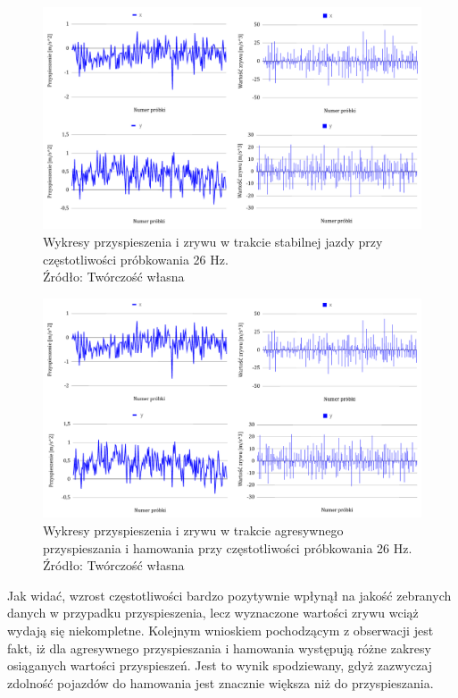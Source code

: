 \begin{figure}[H]
	\centering
	\includegraphics[width=15cm]{img/driving_analysis/stabilna_26.png}
	\caption{Wykresy przyspieszenia i zrywu w trakcie stabilnej jazdy przy częstotliwości próbkowania 26 Hz.
	\\Źródło: Twórczość własna}
	\label{fig:image_driving_analysis_test_26Hz}
\end{figure}

\begin{figure}[H]
	\centering
	\includegraphics[width=15cm]{img/driving_analysis/Ostre_przyspieszenie_26Hz.png}
	\caption{Wykresy przyspieszenia i zrywu w trakcie agresywnego przyspieszania i hamowania przy częstotliwości próbkowania 26 Hz.
	\\Źródło: Twórczość własna}
	\label{fig:image_driving_analysis_test_acc_26Hz}
\end{figure}

\clearpage
Jak widać, wzrost częstotliwości bardzo pozytywnie wpłynął na jakość zebranych danych w przypadku przyspieszenia, lecz wyznaczone wartości zrywu wciąż wydają się niekompletne. Kolejnym wnioskiem pochodzącym z obserwacji jest fakt, iż dla agresywnego przyspieszania i hamowania występują różne zakresy osiąganych wartości przyspieszeń. Jest to wynik spodziewany, gdyż zazwyczaj zdolność pojazdów do hamowania jest znacznie większa niż do przyspieszania. 

